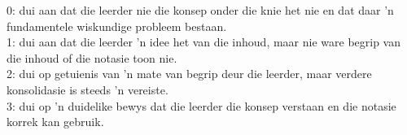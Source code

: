 0: dui aan dat die leerder nie die konsep onder die knie het nie en dat daar 'n fundamentele wiskundige probleem bestaan.\\
1: dui aan dat die leerder 'n idee het van die inhoud, maar nie ware begrip van die inhoud of die notasie toon nie.\\
2: dui op getuienis van 'n mate van begrip deur die leerder, maar verdere konsolidasie is steeds 'n vereiste.\\
3: dui op 'n duidelike bewys dat die leerder die konsep verstaan en die notasie korrek kan gebruik.

